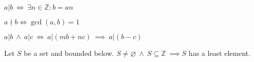 
\begin{definition}
		$a|b \ \iff\ \exists n \in \mathbb Z : b = an$
\end{definition}

\begin{definition}
	$a \nmid b \iff \gcd(a, b) = 1$
\end{definition}

\begin{proposition}
	$a|b\ \wedge\ a|c \ \iff\  a|(mb+nc) \ \implies \ a|(b-c)$
\end{proposition}

\begin{theorem}
	Let $S$ be a set and bounded below. $S \neq \varnothing \ \wedge\ S \subseteq
	\mathbb Z \ \implies S$ has a least element. 
\end{theorem}



